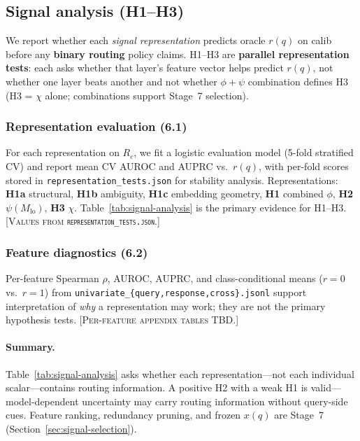 \subsection{Signal analysis (H1--H3)}
\label{sec:results-signals}

We report whether each \emph{signal representation} predicts oracle $r(q)$ on calib before any \textbf{binary routing} policy claims.
H1--H3 are \textbf{parallel representation tests}: each asks whether that layer's feature vector helps predict $r(q)$, not whether one layer beats another and not whether $\phi{+}\psi$ combination defines H3 (H3 = $\chi$ alone; combinations support Stage~7 selection).

\subsubsection{Representation evaluation (6.1)}
\label{sec:results-signals-representation}

For each representation on $R_c$, we fit a logistic evaluation model (5-fold stratified CV) and report mean CV AUROC and AUPRC vs.\ $r(q)$, with per-fold scores stored in \texttt{representation\_tests.json} for stability analysis.
Representations: \textbf{H1a} structural, \textbf{H1b} ambiguity, \textbf{H1c} embedding geometry, \textbf{H1} combined $\phi$, \textbf{H2} $\psi(M_{\mathrm{lo}})$, \textbf{H3} $\chi$.
Table~\ref{tab:signal-analysis} is the primary evidence for H1--H3.
\textsc{[Values from \texttt{representation\_tests.json}.]}

\subsubsection{Feature diagnostics (6.2)}
\label{sec:results-signals-diagnostics}

Per-feature Spearman $\rho$, AUROC, AUPRC, and class-conditional means ($r{=}0$ vs.\ $r{=}1$) from \texttt{univariate\_\{query,response,cross\}.jsonl} support interpretation of \emph{why} a representation may work; they are not the primary hypothesis tests.
\textsc{[Per-feature appendix tables TBD.]}



\paragraph{Summary.}
Table~\ref{tab:signal-analysis} asks whether each representation---not each individual scalar---contains routing information.
A positive H2 with a weak H1 is valid---model-dependent uncertainty may carry routing information without query-side cues.
Feature ranking, redundancy pruning, and frozen $x(q)$ are Stage~7 (Section~\ref{sec:signal-selection}).
